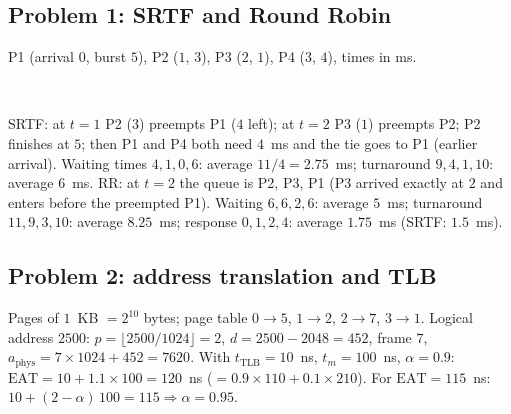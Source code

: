 \documentclass[11pt,a4paper]{article}
\begin{document}
\subsection{Problem 1: SRTF and Round Robin}
P1 (arrival $0$, burst $5$), P2 ($1$, $3$), P3 ($2$, $1$), P4 ($3$, $4$), times in ms.
\begin{center}
\quad{}\\[0.6em]
\quad{}
\end{center}
SRTF: at $t=1$ P2 ($3$) preempts P1 ($4$ left); at $t=2$ P3 ($1$) preempts P2; P2 finishes at $5$; then P1 and P4 both need $4$~ms and the tie goes to P1 (earlier arrival). Waiting times $4, 1, 0, 6$: average $11/4 = 2.75$~ms; turnaround $9, 4, 1, 10$: average $6$~ms. RR: at $t=2$ the queue is P2, P3, P1 (P3 arrived exactly at $2$ and enters before the preempted P1). Waiting $6, 6, 2, 6$: average $5$~ms; turnaround $11, 9, 3, 10$: average $8.25$~ms; response $0, 1, 2, 4$: average $1.75$~ms (SRTF: $1.5$~ms).

\subsection{Problem 2: address translation and TLB}
Pages of $1$~KB $= 2^{10}$ bytes; page table $0\to5$, $1\to2$, $2\to7$, $3\to1$. Logical address $2500$: $p = \lfloor 2500/1024 \rfloor = 2$, $d = 2500 - 2048 = 452$, frame $7$, $a_{\text{phys}} = 7 \times 1024 + 452 = 7620$. With $t_{\text{TLB}} = 10$~ns, $t_m = 100$~ns, $\alpha = 0.9$: $\text{EAT} = 10 + 1.1 \times 100 = 120$~ns ($= 0.9 \times 110 + 0.1 \times 210$). For $\text{EAT} = 115$~ns: $10 + (2-\alpha)\,100 = 115 \Rightarrow \alpha = 0.95$.
\end{document}
